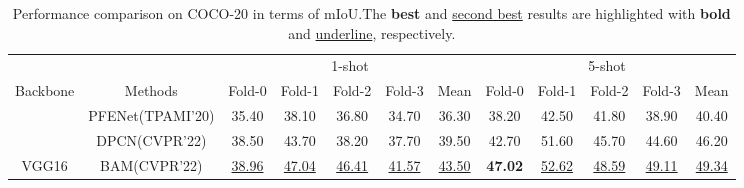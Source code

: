 \documentclass[10pt,twocolumn,letterpaper]{article}
\begin{document}
\begin{table*}[htbp]
	\renewcommand\tabcolsep{3.7pt}
	\centering
	\caption{Performance comparison on COCO-20 in terms of mIoU.The \textbf{best} and \underline{second best} results are highlighted with \textbf{bold} and \underline{underline}, respectively.}
	\begin{tabular}{c|c|ccccc|ccccc}
		\hline
		&                              & \multicolumn{5}{c|}{1-shot}                                                                                                                                                                                & \multicolumn{5}{c}{5-shot}                                                                                                                                                               \\ \cline{3-12} 
		\multirow{-2}{*}{Backbone} & \multirow{-2}{*}{Methods}    & Fold-0                                 & Fold-1                                & Fold-2                                 & Fold-3                                 & Mean                                   & Fold-0                       & Fold-1                                 & Fold-2                                 & Fold-3                                 & Mean                          \\ \hline
		& PFENet(TPAMI'20)\cite{pfenet}                       & 35.40                                  & 38.10                                  & 36.80                                  & 34.70                                  & 36.30                                  & 38.20                         & 42.50                                  & 41.80                                  & 38.90                                  & 40.40                         \\
		& DPCN(CVPR'22)\cite{dpcn}                         & 38.50                                  & 43.70                                  & 38.20                                  & 37.70                                  & 39.50                                  & 42.70                         & 51.60                                  & 45.70                                  & 44.60                                  & 46.20                         \\
		VGG16                      & BAM(CVPR'22)\cite{bam}                          & \underline{38.96}                                  & \underline{47.04}                                  & \underline{46.41}                                  & \underline{41.57}                                  & \underline{43.50}                                  & \textbf{47.02}                & \underline{52.62}                                  & \underline{48.59}                                  & \underline{49.11}                                  & \underline{49.34}                \\ 

\end{tabular}
\end{table*}
\end{document}
